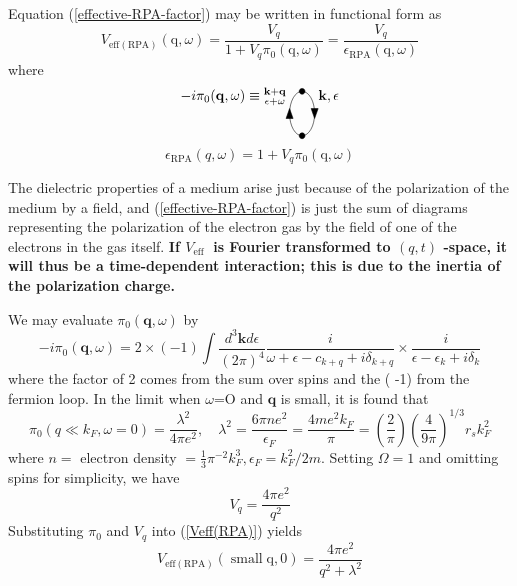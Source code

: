 Equation (\ref{effective-RPA-factor}) may be written in functional form as
\begin{equation}V_{\mathrm{eff}(\mathrm{RPA})}(\mathrm{q}, \omega)=\frac{V_{q}}{1+V_{q} \pi_{0}(\mathrm{q}, \omega)}=\frac{V_{q}}{\epsilon_{\mathrm{RPA}}(\mathrm{q}, \omega)}
\label{Veff(RPA)}
\end{equation}
where
\begin{equation}
    -i\pi_0(\mathbf{q},\omega)\equiv\substack{\mathbf{k+q}\\\epsilon+\omega}\fermiloop\mathbf{k},\epsilon
\end{equation}
\begin{equation}\epsilon_{\mathrm{RPA}}(q, \omega)=1+V_{q} \pi_{0}(\mathrm{q}, \omega)\end{equation}
\begin{mybox}
The dielectric properties of a medium arise just because of the polarization of the medium by a field, and (\ref{effective-RPA-factor}) is just the sum of diagrams representing the polarization of the electron gas by the field of one of the electrons in the gas itself.\textbf{ If $V_{\text {eff }}$ is Fourier transformed to $(q, t)$ -space, it will thus be a time-dependent interaction; this is due to the inertia of the polarization charge.}
\end{mybox}
We may evaluate $\pi_0(\mathbf{q},\omega)$ by
\begin{equation}-i \pi_{0}(\mathbf{q}, \omega)=2 \times(-1) \int \frac{d^{3} \mathbf{k} d \epsilon}{(2 \pi)^{4}} \frac{i}{\omega+\epsilon-c_{k+q}+i \delta_{k+q}} \times \frac{i}{\epsilon-\epsilon_{k}+i \delta_{k}}\end{equation}
where the factor of 2 comes from the sum over spins and the ( -1) from the fermion loop. In
the limit when $\omega$=O and $\mathbf{q}$ is small, it is found that
\begin{equation}\pi_{0}\left(q \ll k_{F}, \omega=0\right)=\frac{\lambda^{2}}{4 \pi e^{2}}, \quad \lambda^{2}=\frac{6 \pi n e^{2}}{\epsilon_{F}}=\frac{4 m e^{2} k_{F}}{\pi}=\left(\frac{2}{\pi}\right)\left(\frac{4}{9 \pi}\right)^{1 / 3} r_{s} k_{F}^{2}\end{equation}
where $n=$ electron density $=\frac{1}{3} \pi^{-2} k_{F}^{3}, \epsilon_{F}=k_{F}^{2} / 2 m$. Setting $\Omega=1$ and omitting spins for simplicity, we have \begin{equation}V_{q}=\frac{4 \pi e^{2}}{q^{2}}\end{equation}
Substituting $\pi_0$ and $V_q$ into (\ref{Veff(RPA)}) yields
\begin{equation}V_{\mathrm{eff}(\mathrm{RPA})}(\operatorname{small} \mathrm{q}, 0)=\frac{4 \pi e^{2}}{q^{2}+\lambda^{2}}\end{equation}

